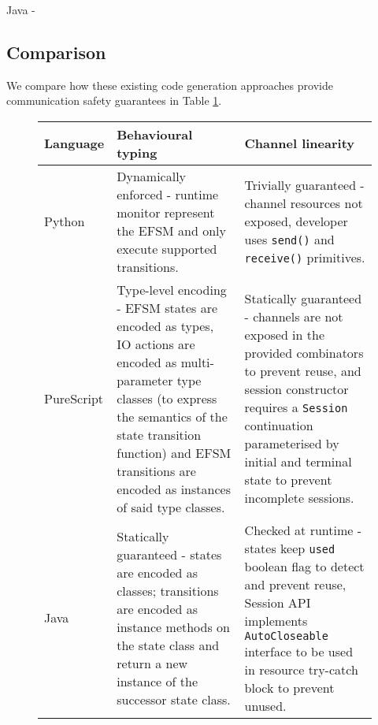 Java - \cite{Hybrid2016}

\subsection{Comparison}
\label{section:codegencompare}

We compare how these existing code generation approaches provide communication safety guarantees in Table \ref{table:comparison}.


\begin{figure}[!h]
\centering
\begin{tabular}{l || p{} | p{}}
Language & Behavioural typing & Channel linearity \\
\hline\hline
Python \cite{Python2017} & Dynamically enforced - runtime monitor represent the EFSM and only execute supported transitions. & Trivially guaranteed - channel resources not exposed, developer uses \texttt{send()} and \texttt{receive()} primitives. \\
\hline
PureScript \cite{PureScript2019} & Type-level encoding - EFSM states are encoded as types, IO actions are encoded as multi-parameter type classes (to express the semantics of the state transition function) and EFSM transitions are encoded as instances of said type classes. & Statically guaranteed - channels are not exposed in the provided combinators to prevent reuse, and session constructor requires a \texttt{Session} continuation parameterised by initial and terminal state to prevent incomplete sessions.  \\
\hline
Java \cite{Hybrid2016} & Statically guaranteed - states are encoded as classes; transitions are encoded as instance methods on the state class and return a new instance of the successor state class. & Checked at runtime - states keep \texttt{used} boolean flag to detect and prevent reuse, Session API implements \texttt{AutoCloseable} interface to be used in resource try-catch block to prevent unused.
\end{tabular}
\label{table:comparison}
\end{figure}
